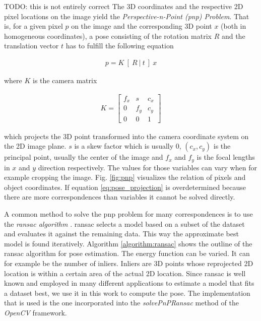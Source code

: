 TODO: this is not entirely correct
The 3D coordinates and the respective 2D pixel locations on the image yield the \textit{Perspective-n-Point (\gls{pnp}) Problem}. That is, for a given pixel $p$ on the image and the corresponding 3D point $x$ (both in homogeneous coordinates), a pose consisting of the rotation matrix $R$ and the translation vector $t$ has to fulfill the following equation

\begin{align}
 p = K \ [ \ R \ | \ t \ ] \ x \label{eq:pose_projection}
\end{align} 

where $K$ is the camera matrix

\begin{align}
K = \begin{bmatrix}
f_x & s & c_x \\
0 & f_y & c_y \\
0 & 0 & 1 
\end{bmatrix}
\end{align}

which projects the 3D point transformed into the camera coordinate system on the 2D image plane. $s$ is a skew factor which is usually $0$, $(c_x, c_y)$ is the principal point, usually the center of the image and $f_x$ and $f_y$ is the focal lengths in $x$ and $y$ direction respectively. The values for those variables can vary when for example cropping the image. Fig. \ref{fig:pnp} visualizes the relation of pixels and object coordinates. If equation \ref{eq:pose_projection} is overdetermined because there are more correspondences than variables it cannot be solved directly.

A common method to solve the \gls{pnp} problem for many correspondences is to use the \textit{\gls{ransac} algorithm} \cite{ransac}. \gls{ransac} selects a model based on a subset of the dataset and evaluates it against the remaining data. This way the approximate best model is found iteratively. Algorithm \ref{algorithm:ransac} shows the outline of the \gls{ransac} algorithm for pose estimation. The energy function can be varied. It can for example be the number of inliers. Inliers are 3D points whose reprojected 2D location is within a certain area of the actual 2D location. Since \gls{ransac} is well known and employed in many different applications to estimate a model that fits a dataset best, we use it in this work to compute the pose. The implementation that is used is the one incorporated into the \textit{solvePnPRansac} method of the \textit{OpenCV} \cite{opencv} framework. 


